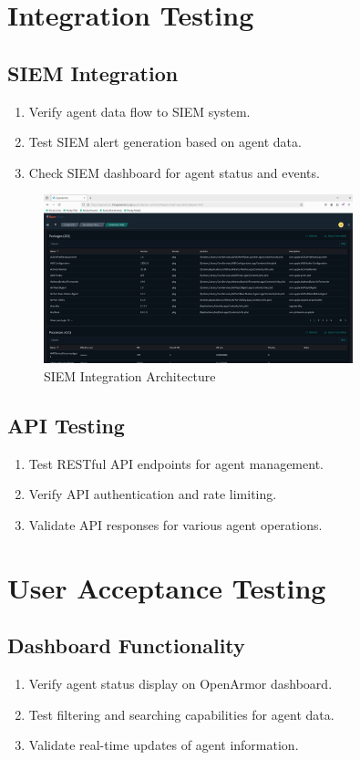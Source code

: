 \section{Integration Testing}
\subsection{SIEM Integration}
\begin{enumerate}
    \item Verify agent data flow to SIEM system.
    \item Test SIEM alert generation based on agent data.
    \item Check SIEM dashboard for agent status and events.
\end{enumerate}

\begin{figure}[h]
    \centering
    \includegraphics[width=0.8\textwidth]{openarmor-agent/8.png}
    \caption{SIEM Integration Architecture}
    \label{fig:siem-integration}
\end{figure}

\subsection{API Testing}
\begin{enumerate}
    \item Test RESTful API endpoints for agent management.
    \item Verify API authentication and rate limiting.
    \item Validate API responses for various agent operations.
\end{enumerate}

\section{User Acceptance Testing}
\subsection{Dashboard Functionality}
\begin{enumerate}
    \item Verify agent status display on OpenArmor dashboard.
    \item Test filtering and searching capabilities for agent data.
    \item Validate real-time updates of agent information.
\end{enumerate}

